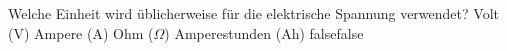     {Welche Einheit wird üblicherweise für die elektrische Spannung verwendet?}
    {Volt (V)}
    {Ampere (A)}
    {Ohm ($\Omega$)}
    {Amperestunden (Ah)}
    {false}{false}